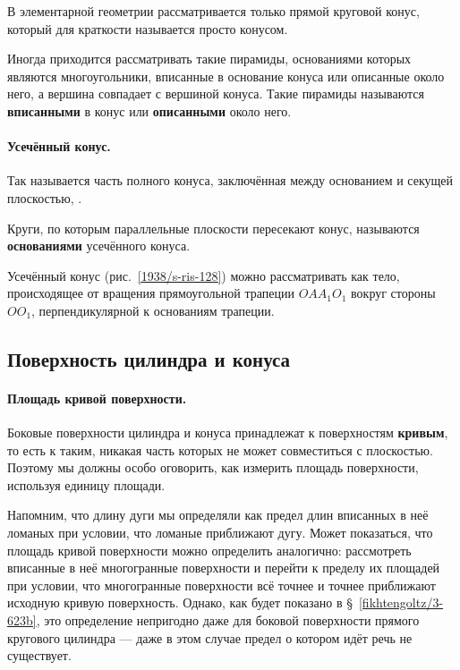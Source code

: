 В элементарной геометрии рассматривается только прямой круговой конус, который для краткости называется просто конусом.

Иногда приходится рассматривать такие пирамиды, основаниями которых являются многоугольники, вписанные в основание конуса или описанные около него, а вершина совпадает с вершиной конуса.
Такие пирамиды называются \textbf{вписанными} в конус или \textbf{описанными} около него.

\paragraph{Усечённый конус.}\label{1938/s110}
Так называется часть полного конуса, заключённая между основанием и секущей плоскостью, .

Круги, по которым параллельные плоскости пересекают конус, называются \textbf{основаниями} усечённого конуса.

Усечённый конус (рис.~\ref{1938/s-ris-128}) можно рассматривать как тело, происходящее от вращения прямоугольной трапеции $OAA_1O_1$ вокруг стороны $OO_1$, перпендикулярной к основаниям трапеции.

\subsection*{Поверхность цилиндра и конуса}

\paragraph{Площадь кривой поверхности.}\label{1938/s111}
Боковые поверхности цилиндра и конуса принадлежат к поверхностям {}\textbf{кривым}, то есть к таким, никакая часть которых не может совместиться с плоскостью.
Поэтому мы должны особо оговорить, как измерить площадь  поверхности, используя  единицу площади.

Напомним, что длину дуги мы определяли как предел длин вписанных в неё ломаных при условии, что ломаные приближают дугу.
Может показаться, что площадь кривой поверхности можно определить аналогично: рассмотреть вписанные в неё многогранные поверхности и перейти к пределу их площадей при условии, что многогранные поверхности всё точнее и точнее приближают исходную кривую поверхность.
Однако, как будет показано в §~\ref{fikhtengoltz/3-623b}, это определение непригодно даже для боковой поверхности прямого кругового цилиндра --- даже в этом случае предел о котором идёт речь не существует.

